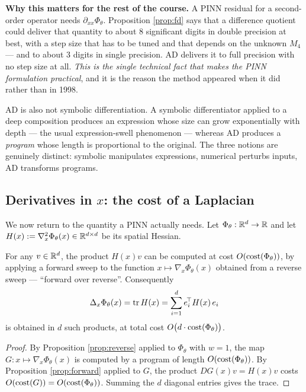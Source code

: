 \documentclass[11pt,a4paper]{article}
\begin{document}
\begin{keyboxwine}
\textbf{Why this matters for the rest of the course.} A PINN residual for a second-order operator
needs $\partial_{xx}\Phi_\theta$. Proposition \ref{prop:fd} says that a difference quotient could
deliver that quantity to about $8$ significant digits in double precision at best, with a step size
that has to be tuned and that depends on the unknown $M_4$ --- and to about $3$ digits in single
precision. AD delivers it to full precision with no step size at all. \emph{This is the single
technical fact that makes the PINN formulation practical}, and it is the reason the method appeared
when it did rather than in 1998.
\end{keyboxwine}

\begin{remark}
AD is also not symbolic differentiation. A symbolic differentiator applied to a deep composition
produces an expression whose size can grow exponentially with depth --- the usual expression-swell
phenomenon --- whereas AD produces a \emph{program} whose length is proportional to the original.
The three notions are genuinely distinct: symbolic manipulates expressions, numerical perturbs
inputs, AD transforms programs.
\end{remark}

\subsection{Derivatives in $x$: the cost of a Laplacian}

We now return to the quantity a PINN actually needs. Let $\Phi_\theta : \mathbb{R}^d \to \mathbb{R}$ and let
$H(x) := \nabla^2_x \Phi_\theta(x) \in \mathbb{R}^{d\times d}$ be its spatial Hessian.

\begin{proposition}\label{prop:hvp}
For any $v \in \mathbb{R}^d$, the product $H(x)v$ can be computed at cost $O(\operatorname{cost}(\Phi_\theta))$, by
applying a forward sweep to the function $x \mapsto \nabla_x \Phi_\theta(x)$ obtained from a reverse
sweep --- ``forward over reverse''. Consequently
\[
\Delta_x \Phi_\theta(x) = \operatorname{tr} H(x) = \sum_{i=1}^d e_i^{\!\top} H(x)\, e_i
\]
is obtained in $d$ such products, at total cost $O\big(d \cdot \operatorname{cost}(\Phi_\theta)\big)$.
\end{proposition}

\begin{proof}
By Proposition \ref{prop:reverse} applied to $\Phi_\theta$ with $w = 1$, the map
$G : x \mapsto \nabla_x\Phi_\theta(x)$ is computed by a program of length $O(\operatorname{cost}(\Phi_\theta))$.
By Proposition \ref{prop:forward} applied to $G$, the product $DG(x)v = H(x)v$ costs
$O(\operatorname{cost}(G)) = O(\operatorname{cost}(\Phi_\theta))$. Summing the $d$ diagonal entries gives the trace.
\end{proof}
\end{document}
